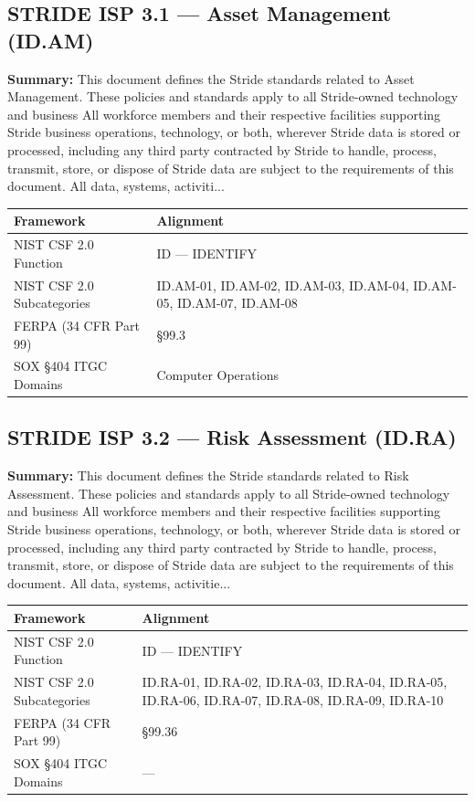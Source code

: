 \documentclass[11pt,landscape]{article}
\begin{document}
\subsection{\textcolor{strideblue}{STRIDE ISP 3.1} --- Asset Management (ID.AM)}
\label{pol:ISP31}

\textbf{Summary:} This document defines the Stride standards related to Asset Management. These policies and standards apply to all Stride-owned technology and business All workforce members and their respective facilities supporting Stride business operations, technology, or both, wherever Stride data is stored or processed, including any third party contracted by Stride to handle, process, transmit, store, or dispose of Stride data are subject to the requirements of this document. All data, systems, activiti...

\begin{tabularx}{\textwidth}{|p{4cm}|X|}
\hline
\rowcolor{headgray} \textbf{Framework} & \textbf{Alignment} \\
\hline
NIST CSF 2.0 Function & ID --- IDENTIFY \\
\hline
NIST CSF 2.0 Subcategories & ID.AM-01, ID.AM-02, ID.AM-03, ID.AM-04, ID.AM-05, ID.AM-07, ID.AM-08 \\
\hline
FERPA (34 CFR Part 99) & §99.3 \\
\hline
SOX §404 ITGC Domains & Computer Operations \\
\hline
\end{tabularx}


\subsection{\textcolor{strideblue}{STRIDE ISP 3.2} --- Risk Assessment (ID.RA)}
\label{pol:ISP32}

\textbf{Summary:} This document defines the Stride standards related to Risk Assessment. These policies and standards apply to all Stride-owned technology and business All workforce members and their respective facilities supporting Stride business operations, technology, or both, wherever Stride data is stored or processed, including any third party contracted by Stride to handle, process, transmit, store, or dispose of Stride data are subject to the requirements of this document. All data, systems, activitie...

\begin{tabularx}{\textwidth}{|p{4cm}|X|}
\hline
\rowcolor{headgray} \textbf{Framework} & \textbf{Alignment} \\
\hline
NIST CSF 2.0 Function & ID --- IDENTIFY \\
\hline
NIST CSF 2.0 Subcategories & ID.RA-01, ID.RA-02, ID.RA-03, ID.RA-04, ID.RA-05, ID.RA-06, ID.RA-07, ID.RA-08, ID.RA-09, ID.RA-10 \\
\hline
FERPA (34 CFR Part 99) & §99.36 \\
\hline
SOX §404 ITGC Domains & --- \\
\hline
\end{tabularx}
\end{document}
